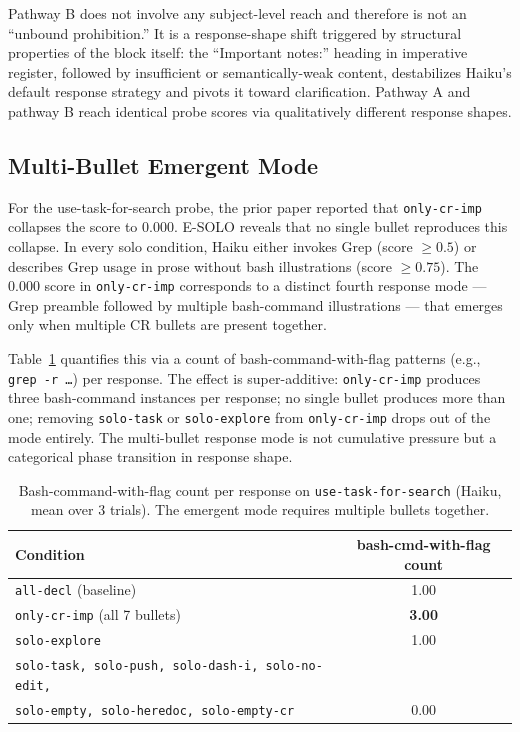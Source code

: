 \documentclass[11pt,a4paper]{article}
\begin{document}
Pathway B does not involve any subject-level reach and therefore is
not an ``unbound prohibition.'' It is a response-shape shift
triggered by structural properties of the block itself: the
``Important notes:'' heading in imperative register, followed by
insufficient or semantically-weak content, destabilizes Haiku's
default response strategy and pivots it toward clarification.
Pathway A and pathway B reach identical probe scores via
qualitatively different response shapes.

\subsection{Multi-Bullet Emergent Mode}

For the use-task-for-search probe, the prior paper reported that
\texttt{only-cr-imp} collapses the score to 0.000. E-SOLO reveals
that no single bullet reproduces this collapse. In every solo
condition, Haiku either invokes Grep (score $\geq 0.5$) or describes
Grep usage in prose without bash illustrations (score $\geq 0.75$).
The 0.000 score in \texttt{only-cr-imp} corresponds to a distinct
fourth response mode --- Grep preamble followed by multiple
bash-command illustrations --- that emerges only when multiple
CR bullets are present together.

Table~\ref{tab:bash} quantifies this via a count of bash-command-with-flag
patterns (e.g., \texttt{grep -r \ldots}) per response. The effect is
super-additive: \texttt{only-cr-imp} produces three bash-command
instances per response; no single bullet produces more than one; removing
\texttt{solo-task} or \texttt{solo-explore} from \texttt{only-cr-imp}
drops out of the mode entirely. The multi-bullet response mode is not
cumulative pressure but a categorical phase transition in response
shape.

\begin{table}[H]
\centering
\caption{Bash-command-with-flag count per response on
\texttt{use-task-for-search} (Haiku, mean over 3 trials).
The emergent mode requires multiple bullets together.}
\label{tab:bash}
\small
\begin{tabular}{lc}
\toprule
Condition & bash-cmd-with-flag count \\
\midrule
\texttt{all-decl} (baseline) & 1.00 \\
\texttt{only-cr-imp} (all 7 bullets) & \textbf{3.00} \\
\midrule
\texttt{solo-explore} & 1.00 \\
\texttt{solo-task, solo-push, solo-dash-i, solo-no-edit,} & \\
\texttt{solo-empty, solo-heredoc, solo-empty-cr} & 0.00 \\
\bottomrule
\end{tabular}
\end{table}
\end{document}
